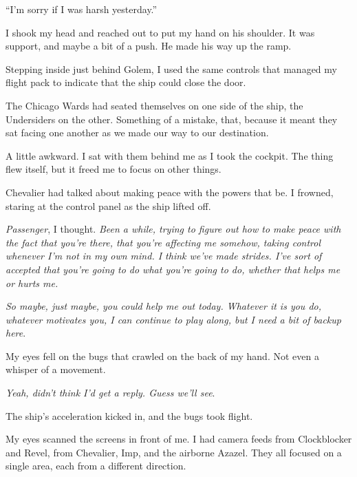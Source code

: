``I'm sorry if I was harsh yesterday.''



I shook my head and reached out to put my hand on his shoulder.  It was support, and maybe a bit of a push.  He made his way up the ramp.



Stepping inside just behind Golem, I used the same controls that managed my flight pack to indicate that the ship could close the door.



The Chicago Wards had seated themselves on one side of the ship, the Undersiders on the other.  Something of a mistake, that, because it meant they sat facing one another as we made our way to our destination.



A little awkward.  I sat with them behind me as I took the cockpit.  The thing flew itself, but it freed me to focus on other things.



Chevalier had talked about making peace with the powers that be.  I frowned, staring at the control panel as the ship lifted off.



\emph{Passenger}, I thought.  \emph{Been a while, trying to figure out how to make peace with the fact that you're there, that you're affecting me somehow, taking control whenever I'm not in my own mind.  I think we've made strides.  I've sort of accepted that you're going to do what you're going to do, whether that helps me or hurts me.  }



\emph{So maybe, just maybe, you could help me out today.  Whatever it is you do, whatever motivates you, I can continue to play along, but I need a bit of backup here}.



My eyes fell on the bugs that crawled on the back of my hand.  Not even a whisper of a movement.



\emph{Yeah, didn't think I'd get a reply.  Guess we'll see}.



The ship's acceleration kicked in, and the bugs took flight.



\blacksquare



My eyes scanned the screens in front of me.  I had camera feeds from Clockblocker and Revel, from Chevalier, Imp, and the airborne Azazel.  They all focused on a single area, each from a different direction.



